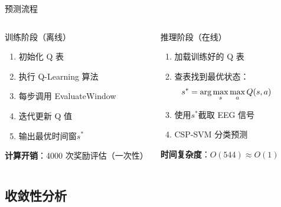{\begin{frame}{预测流程}
    \begin{columns}[T]
        \begin{block}{训练阶段（离线）}
            \footnotesize
            \begin{enumerate}
                \item 初始化 Q 表
                \item 执行 Q-Learning 算法
                \item 每步调用 EvaluateWindow
                \item 迭代更新 Q 值
                \item 输出最优时间窗$s^*$
            \end{enumerate}
            
            \vspace{0.2cm}
            \textbf{计算开销}：4000 次奖励评估（一次性）
        \end{block}

        \begin{alertblock}{推理阶段（在线）}
            \footnotesize
            \begin{enumerate}
                \item 加载训练好的 Q 表
                \item 查表找到最优状态：
                \begin{equation*}
                \footnotesize
                s^* = \arg\max_{s} \max_{a} Q(s, a)
                \end{equation*}
                \item 使用$s^*$截取 EEG 信号
                \item CSP-SVM 分类预测
            \end{enumerate}
            
            \vspace{0.2cm}
            \textbf{时间复杂度}：$O(544) \approx O(1)$
        \end{alertblock}
    \end{columns}

\end{frame}

\subsection{收敛性分析}

}
